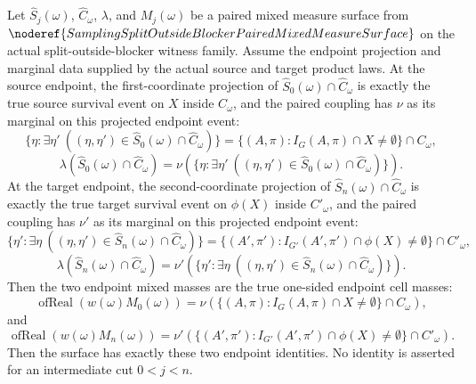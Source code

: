\begin{helper}
Let \(\widehat S_j(\omega)\), \(\widehat C_\omega\), \(\lambda\), and
\(M_j(\omega)\) be a paired mixed measure surface from
\(\noderef{SamplingSplitOutsideBlockerPairedMixedMeasureSurface}\) on the
actual split-outside-blocker witness family.  Assume the endpoint projection
and marginal data supplied by the actual source and target product laws.
At the source endpoint, the first-coordinate projection of
\(\widehat S_0(\omega)\cap\widehat C_\omega\) is exactly the true source
survival event on \(X\) inside \(C_\omega\), and the paired coupling has
\(\nu\) as its marginal on this projected endpoint event:
\[
\{\eta:\exists\eta'\ ((\eta,\eta')\in
  \widehat S_0(\omega)\cap\widehat C_\omega)\}
=\{(A,\pi):I_G(A,\pi)\cap X\ne\emptyset\}\cap C_\omega,
\]
\[
\lambda(\widehat S_0(\omega)\cap\widehat C_\omega)
=\nu(\{\eta:\exists\eta'\ ((\eta,\eta')\in
  \widehat S_0(\omega)\cap\widehat C_\omega)\}).
\]
At the target endpoint, the second-coordinate projection of
\(\widehat S_n(\omega)\cap\widehat C_\omega\) is exactly the true target
survival event on \(\phi(X)\) inside \(C'_\omega\), and the paired coupling
has \(\nu'\) as its marginal on this projected endpoint event:
\[
\{\eta':\exists\eta\ ((\eta,\eta')\in
  \widehat S_n(\omega)\cap\widehat C_\omega)\}
=\{(A',\pi'):I_{G'}(A',\pi')\cap \phi(X)\ne\emptyset\}\cap C'_\omega,
\]
\[
\lambda(\widehat S_n(\omega)\cap\widehat C_\omega)
=\nu'(\{\eta':\exists\eta\ ((\eta,\eta')\in
  \widehat S_n(\omega)\cap\widehat C_\omega)\}).
\]
Then the two endpoint mixed masses are the true one-sided endpoint cell
masses:
\[
\operatorname{ofReal}(w(\omega)M_0(\omega))
=\nu(\{(A,\pi): I_G(A,\pi)\cap X\ne\emptyset\}\cap C_\omega),
\]
and
\[
\operatorname{ofReal}(w(\omega)M_n(\omega))
=\nu'(\{(A',\pi'): I_{G'}(A',\pi')\cap \phi(X)\ne\emptyset\}\cap
C'_\omega).
\]
Then the surface has exactly these two endpoint identities.  No identity is
asserted for an intermediate cut \(0<j<n\).
\end{helper}

